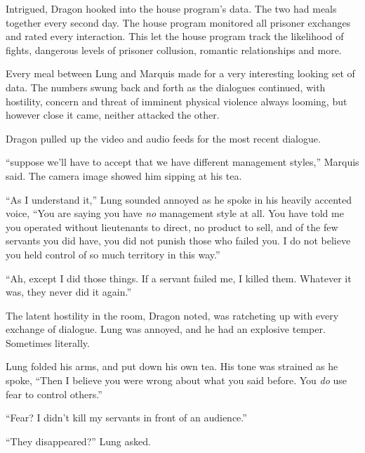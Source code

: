 Intrigued, Dragon hooked into the house program's data.  The two had meals together every second day.  The house program monitored all prisoner exchanges and rated every interaction.  This let the house program track the likelihood of fights, dangerous levels of prisoner collusion, romantic relationships and more.



Every meal between Lung and Marquis made for a very interesting looking set of data.  The numbers swung back and forth as the dialogues continued, with hostility, concern and threat of imminent physical violence always looming, but however close it came, neither attacked the other.



Dragon pulled up the video and audio feeds for the most recent dialogue.



``\ldotsI suppose we'll have to accept that we have different management styles,'' Marquis said.  The camera image showed him sipping at his tea.



``As I understand it,'' Lung sounded annoyed as he spoke in his heavily accented voice, ``You are saying you have \emph{no} management style at all.  You have told me you operated without lieutenants to direct, no product to sell, and of the few servants you did have, you did not punish those who failed you.  I do not believe you held control of so much territory in this way.''



``Ah, except I did those things.  If a servant failed me, I killed them.  Whatever it was, they never did it again.''



The latent hostility in the room, Dragon noted, was ratcheting up with every exchange of dialogue.  Lung was annoyed, and he had an explosive temper.  Sometimes literally.



Lung folded his arms, and put down his own tea.  His tone was strained as he spoke, ``Then I believe you were wrong about what you said before.  You \emph{do} use fear to control others.''



``Fear?  I didn't kill my servants in front of an audience.''



``They disappeared?'' Lung asked.




